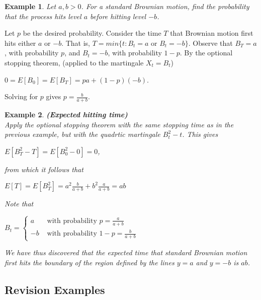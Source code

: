\documentclass[12pt]{article}
\newtheorem{example}{Example}
\begin{document}
\begin{example}
    Let $a, b > 0$. For a standard Brownian motion, find the probability that the process hits level $a$ before hitting level $-b$.
\end{example}

\noindent Let $p$ be the desired probability. Consider the time $T$ that Brownian motion first hits either $a$ or $-b$. That is, $T = min\{t: B_t = a $ or $ B_t = -b\}$. Observe that $B_T = a$, with probability $p$, and $B_t = -b$, with probability $1 - p$. By the optional stopping theorem, (applied to the martingale $X_t = B_t$)
\begin{center}
    $0 = E[B_0] = E[B_T] = pa + (1-p)(-b)$.
\end{center}
Solving for $p$ gives $p = \frac{b}{a+b}$.

\begin{example}
    \textbf{(Expected hitting time)}
    \\Apply the optional stopping theorem with the same stopping time as in the previous example, but with the quadrtic martingale $B_t^2 - t$. This gives
    \begin{center}
        $E[B_T^2 - T] = E[B^2_0 - 0] = 0$,
    \end{center}
    from which it follows that
    \begin{center}
        $E[T] = E[B_T^2] = a^2\frac{b}{a+b} + b^2\frac{a}{a+b} = ab$
    \end{center}
    Note that
    \begin{center}
        $B_t = \begin{cases}
          a & \text{ with probability } p = \frac{a}{a+b}\\
          -b & \text{ with probability } 1 - p = \frac{b}{a+b}
        \end{cases}$
    \end{center}
    We have thus discovered that the expected time that standard Brownian motion first hits the boundary of the region defined by the lines $y = a$ and $y = -b$ is $ab$.
\end{example}

\subsection{Revision Examples}
\end{document}
